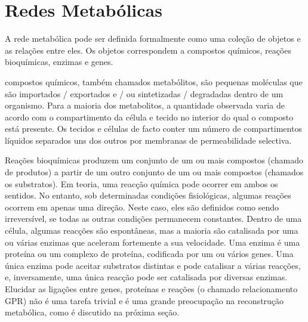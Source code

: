 \chapter{Redes Metabólicas}




\indent A rede metabólica pode ser definida formalmente como uma coleção de objetos e as relações entre eles. Os objetos correspondem a compostos químicos, reações bioquímicas, enzimas e genes.

\indent compostos químicos, também chamados metabólitos, são pequenas moléculas que são importados / exportados e / ou sintetizadas / degradadas dentro de um organismo. Para a maioria dos metabolitos, a quantidade observada varia de acordo com o compartimento da célula e tecido no interior do qual o composto está presente. Os tecidos e células de facto conter um número de compartimentos líquidos separados uns dos outros por membranas de permeabilidade selectiva.

\indent Reações bioquímicas produzem um conjunto de um ou mais compostos (chamado de produtos) a partir de um outro conjunto de um ou mais compostos (chamados os substratos). Em teoria, uma reacção química pode ocorrer em ambos os sentidos. No entanto, sob determinadas condições fisiológicas, algumas reações ocorrem em apenas uma direção. Neste caso, eles são definidos como sendo irreversível, se todas as outras condições permanecem constantes. Dentro de uma célula, algumas reacções são espontâneas, mas a maioria são catalisada por uma ou várias enzimas que aceleram fortemente a sua velocidade. Uma enzima é uma proteína ou um complexo de proteína, codificada por um ou vários genes. Uma única enzima pode aceitar substratos distintas e pode catalisar a várias reacções, e, inversamente, uma única reacção pode ser catalisada por diversas enzimas. Elucidar as ligações entre genes, proteínas e reações (o chamado relacionamento GPR) não é uma tarefa trivial e é uma grande preocupação na reconstrução metabólica, como é discutido na próxima seção.


